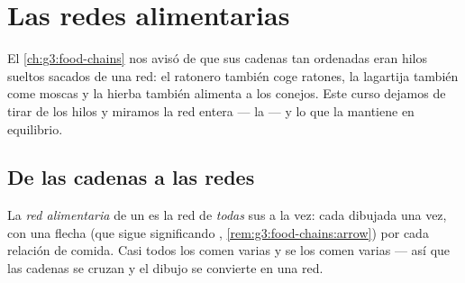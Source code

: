 \chapter{Las redes alimentarias}\label{ch:g5:food-webs}

El \cref{ch:g3:food-chains} nos avisó de que sus cadenas tan ordenadas
eran hilos sueltos sacados de una red: el ratonero también coge
ratones, la lagartija también come moscas y la hierba también alimenta
a los conejos. Este curso dejamos de tirar de los hilos y miramos la
red entera --- la  --- y lo que la mantiene en
equilibrio.

\section{De las cadenas a las redes}

\begin{definition}\label{def:g5:food-webs:web}
La \emph{red alimentaria} de un  es la
red de \emph{todas} sus  a la vez: cada 
dibujada una vez, con una flecha (que sigue significando \emph{}, \cref{rem:g3:food-chains:arrow}) por cada relación de
comida. Casi todos los  comen varias  y se los comen
varias --- así que las cadenas se cruzan y el dibujo se convierte en
una red.
\end{definition}

